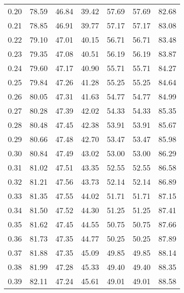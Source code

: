 \begin{tabular}{|c|c|c|c|c|c|c|}
      0.20 &     78.59 &     46.84 &      39.42 &   57.69 &      57.69 &         82.68 \\
      0.21 &     78.85 &     46.91 &      39.77 &   57.17 &      57.17 &         83.08 \\
      0.22 &     79.10 &     47.01 &      40.15 &   56.71 &      56.71 &         83.48 \\
      0.23 &     79.35 &     47.08 &      40.51 &   56.19 &      56.19 &         83.87 \\
      0.24 &     79.60 &     47.17 &      40.90 &   55.71 &      55.71 &         84.27 \\
      0.25 &     79.84 &     47.26 &      41.28 &   55.25 &      55.25 &         84.64 \\
      0.26 &     80.05 &     47.31 &      41.63 &   54.77 &      54.77 &         84.99 \\
      0.27 &     80.28 &     47.39 &      42.02 &   54.33 &      54.33 &         85.35 \\
      0.28 &     80.48 &     47.45 &      42.38 &   53.91 &      53.91 &         85.67 \\
      0.29 &     80.66 &     47.48 &      42.70 &   53.47 &      53.47 &         85.98 \\
      0.30 &     80.84 &     47.49 &      43.02 &   53.00 &      53.00 &         86.29 \\
      0.31 &     81.02 &     47.51 &      43.35 &   52.55 &      52.55 &         86.58 \\
      0.32 &     81.21 &     47.56 &      43.73 &   52.14 &      52.14 &         86.89 \\
      0.33 &     81.35 &     47.55 &      44.02 &   51.71 &      51.71 &         87.15 \\
      0.34 &     81.50 &     47.52 &      44.30 &   51.25 &      51.25 &         87.41 \\
      0.35 &     81.62 &     47.45 &      44.55 &   50.75 &      50.75 &         87.66 \\
      0.36 &     81.73 &     47.35 &      44.77 &   50.25 &      50.25 &         87.89 \\
      0.37 &     81.88 &     47.35 &      45.09 &   49.85 &      49.85 &         88.14 \\
      0.38 &     81.99 &     47.28 &      45.33 &   49.40 &      49.40 &         88.35 \\
      0.39 &     82.11 &     47.24 &      45.61 &   49.01 &      49.01 &         88.58 \\

\end{tabular}
